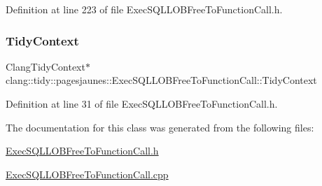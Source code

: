 Definition at line 223 of file Exec\+S\+Q\+L\+L\+O\+B\+Free\+To\+Function\+Call.\+h.

\mbox{\label{classclang_1_1tidy_1_1pagesjaunes_1_1_exec_s_q_l_l_o_b_free_to_function_call_a8a10bcf195371f56a58da7859ae85407}} 
\subsubsection{\texorpdfstring{Tidy\+Context}{TidyContext}}
{\footnotesize\ttfamily Clang\+Tidy\+Context$\ast$ clang\+::tidy\+::pagesjaunes\+::\+Exec\+S\+Q\+L\+L\+O\+B\+Free\+To\+Function\+Call\+::\+Tidy\+Context}



Definition at line 31 of file Exec\+S\+Q\+L\+L\+O\+B\+Free\+To\+Function\+Call.\+h.



The documentation for this class was generated from the following files\+:\begin{DoxyCompactItemize}
\item 
\hyperlink{_exec_s_q_l_l_o_b_free_to_function_call_8h}{Exec\+S\+Q\+L\+L\+O\+B\+Free\+To\+Function\+Call.\+h}\item 
\hyperlink{_exec_s_q_l_l_o_b_free_to_function_call_8cpp}{Exec\+S\+Q\+L\+L\+O\+B\+Free\+To\+Function\+Call.\+cpp}\end{DoxyCompactItemize}
